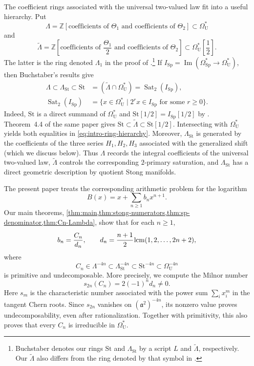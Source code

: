 \documentclass[14pt,dvipsnames]{extarticle}
\numberwithin{equation}{subsection}
\theoremstyle{plain}
\theoremstyle{definition}
\theoremstyle{definition}
\DeclareMathOperator{\lcm}{lcm}
\newcommand{\OmU}{\Omega_{\mathrm U}^{\ast}}
\newcommand{\OmSp}{\Omega_{\mathrm{Sp}}^{\ast}}
\newcommand{\Sp}{\mathrm{Sp}}
\newcommand{\Uu}{\mathrm{U}}
\newcommand{\St}{\mathrm{St}}
\newcommand{\LambdaSt}{\Lambda_{\mathrm{St}}}
\begin{document}
The coefficient rings associated with the universal two-valued law fit into a
useful hierarchy. Put
\[
 \Lambda
 =\mathbb Z[\text{coefficients of }\Theta_1\text{ and }
                  \text{coefficients of }\Theta_2]
 \subset\OmU
\]
and
\[
 \widetilde\Lambda
 =\mathbb Z\left[
    \text{coefficients of }\frac{\Theta_1}{2}\text{ and }
    \text{coefficients of }\Theta_2
  \right]
 \subset\OmU\!\left[\frac12\right].
\]
The latter is the ring denoted $\Lambda_1$ in the proof of
\cite[Theorem~4.4]{Buc78}.\footnote{Buchstaber denotes our rings $\St$ and
$\LambdaSt$ by a script $L$ and $\widetilde\Lambda$, respectively. Our $\widetilde\Lambda$ also differs from
the ring denoted by that symbol in \cite{Buc78}.}
If $I_{\Sp}=\operatorname{Im}(\OmSp\to\OmU)$, then Buchstaber's results give
\begin{equation}\label{eq:intro-ring-hierarchy}
\begin{aligned}
 \Lambda\subset\LambdaSt\subset\St
 &=(\widetilde\Lambda\cap\OmU)
 =\operatorname{Sat}_2(I_{\Sp}),\\
 \operatorname{Sat}_2(I_{\Sp})
 &=\{x\in\OmU\mid 2^rx\in I_{\Sp}\text{ for some }r\geq0\}.
\end{aligned}
\end{equation}
Indeed, $\St$ is a direct summand of $\OmU$ and
$\St[1/2]=I_{\Sp}[1/2]$ by \cite[Theorem~4.1 and Lemma~6.6]{Buc78}.
Theorem~4.4 of the same paper gives
$\St\subset\widetilde\Lambda\subset\St[1/2]$.
Intersecting with $\OmU$ yields both equalities in
\eqref{eq:intro-ring-hierarchy}.
Moreover, $\LambdaSt$ is generated by the coefficients of the three
series $H_1,H_2,H_3$ associated with the generalized shift (which we discuss
below). Thus $\Lambda$
records the integral coefficients of the universal two-valued law,
$\widetilde\Lambda$ controls the corresponding $2$-primary saturation, and
$\LambdaSt$ has a direct geometric description by quotient Stong manifolds.

The present paper treats the corresponding arithmetic problem for the
logarithm
\[
B(x)=x+\sum_{n\geq1}b_nx^{n+1}.
\]
Our main theorems,
\cref{thm:main,thm:stong-numerators,thm:sp-denominator,thm:Cn-Lambda}, show that for each
$n\geq1$,
\begin{equation}\label{denominator_d_n}
b_n=\frac{C_n}{d_n},
\qquad
d_n= \cfrac{n+1}{2} \lcm(1,2,\ldots,2n+2),
\end{equation}
where
\[
 C_n\in\Lambda^{-4n}\subset\LambdaSt^{-4n}\subset\St^{-4n}
 \subset\Omega_{\Uu}^{-4n}
\]
is primitive and undecomposable. More precisely, we compute the Milnor number
\[
 s_{2n}(C_n)=2(-1)^n d_n\ne0.
\]
Here $s_m$ is the characteristic number associated with the power sum
$\sum_i x_i^m$ in the tangent Chern roots.
Since $s_{2n}$ vanishes on $(\mathfrak a^2)^{-4n}$, its nonzero value proves
undecomposability, even after rationalization. Together with primitivity,
this also proves that every $C_n$ is irreducible in $\OmU$.
\end{document}
